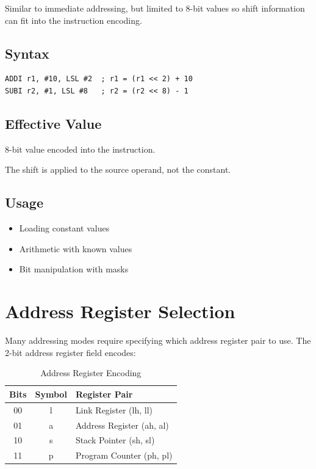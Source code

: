 Similar to immediate addressing, but limited to 8-bit values so shift information can fit into the instruction
encoding.

\subsection{Syntax}

\begin{lstlisting}
ADDI r1, #10, LSL #2  ; r1 = (r1 << 2) + 10
SUBI r2, #1, LSL #8   ; r2 = (r2 << 8) - 1
\end{lstlisting}

\subsection{Effective Value}

8-bit value encoded into the instruction.

The shift is applied to the source operand, not the constant.

\subsection{Usage}

\begin{itemize}
	\item Loading constant values
	\item Arithmetic with known values
	\item Bit manipulation with masks
\end{itemize}

\section{Address Register Selection}

Many addressing modes require specifying which address register pair to use. The 2-bit address register field encodes:

\begin{table}[H]
	\centering
	\begin{tabular}{ccl}
		\toprule
		\textbf{Bits} & \textbf{Symbol} & \textbf{Register Pair}    \\
		\midrule
		00            & l               & Link Register (lh, ll)    \\
		01            & a               & Address Register (ah, al) \\
		10            & s               & Stack Pointer (sh, sl)    \\
		11            & p               & Program Counter (ph, pl)  \\
		\bottomrule
	\end{tabular}
	\caption{Address Register Encoding}
	\label{tab:addr-reg-encoding}
\end{table}

